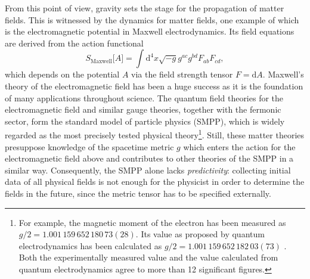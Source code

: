 From this point of view, gravity sets the stage for the propagation of matter fields. This is witnessed by the dynamics for matter fields, one example of which is the electromagnetic potential in Maxwell electrodynamics. Its field equations are derived from the action functional
\begin{equation*}
  S_\text{Maxwell}\lbrack A\rbrack = \int\mathrm d^4x \sqrt{-g} g^{ac} g^{bd} F_{ab} F_{cd},
\end{equation*}
which depends on the potential $A$ via the field strength tensor $F = \mathrm dA$. Maxwell's theory of the electromagnetic field has been a huge success as it is the foundation of many applications throughout science. The quantum field theories for the electromagnetic field and similar gauge theories, together with the fermonic sector, form the standard model of particle physics (SMPP), which is widely regarded as the most precisely tested physical theory\footnote{For example, the magnetic moment of the electron has been measured as $g/2 = 1.001\,159\,652\,180\,73(28)$. \cite{Hanneke_2011} Its value as proposed by quantum electrodynamics has been calculated as $g/2 = 1.001\,159\,652\,182\,03(73)$ \cite{Aoyama_2017}. Both the experimentally measured value and the value calculated from quantum electrodynamics agree to more than 12 significant figures.}. Still, these matter theories presuppose knowledge of the spacetime metric $g$ which enters the action for the electromagnetic field above and contributes to other theories of the SMPP in a similar way. Consequently, the SMPP alone lacks \emph{predictivity}: collecting initial data of all physical fields is not enough for the physicist in order to determine the fields in the future, since the metric tensor has to be specified externally. 

